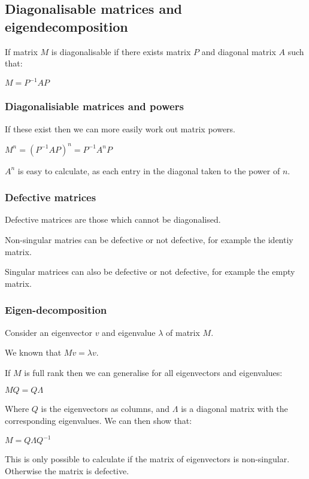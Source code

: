 
\subsection{Diagonalisable matrices and eigendecomposition}

If matrix \(M\) is diagonalisable if there exists matrix \(P\) and diagonal matrix \(A\) such that:

\(M=P^{-1}AP\)

\subsubsection{Diagonalisiable matrices and powers}

If these exist then we can more easily work out matrix powers.

\(M^n=(P^{-1}AP)^n=P^{-1}A^nP\)

\(A^n\) is easy to calculate, as each entry in the diagonal taken to the power of \(n\).

\subsubsection{Defective matrices}

Defective matrices are those which cannot be diagonalised.

Non-singular matries can be defective or not defective, for example the identiy matrix.

Singular matrices can also be defective or not defective, for example the empty matrix.

\subsubsection{Eigen-decomposition}

Consider an eigenvector \(v\) and eigenvalue \(\lambda \) of matrix \(M\).

We known that \(Mv=\lambda v\).

If \(M\) is full rank then we can generalise for all eigenvectors and eigenvalues:

$MQ=Q\Lambda$

Where \(Q\) is the eigenvectors as columns, and \(\Lambda \) is a diagonal matrix with the corresponding eigenvalues. We can then show that:

\(M=Q\Lambda Q^{-1}\)

This is only possible to calculate if the matrix of eigenvectors is non-singular. Otherwise the matrix is defective.

